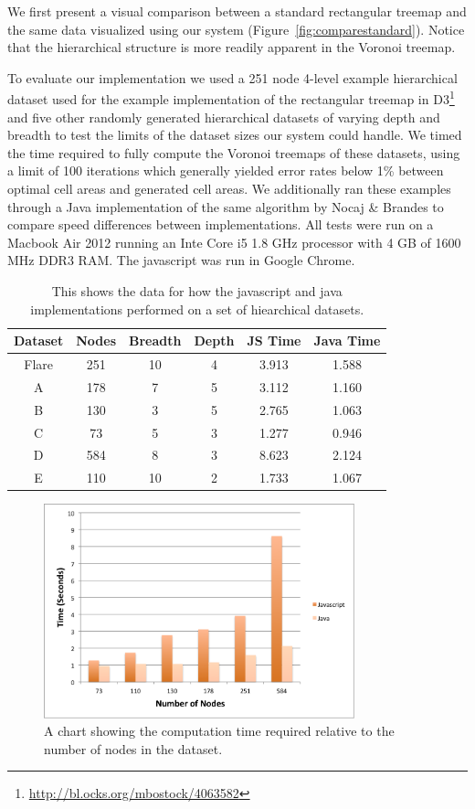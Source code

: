 \documentclass{acm_proc_article-sp} \usepackage{cite}
\begin{document}
We first present a visual comparison between a standard rectangular treemap and the
same data visualized using our system (Figure~\ref{fig:comparestandard}).
Notice that the hierarchical structure is more readily
apparent in the Voronoi treemap.

To evaluate our implementation we used a 251 node 4-level example
hierarchical dataset used for the example implementation of the
rectangular treemap in D3\footnote{\url{http://bl.ocks.org/mbostock/4063582} }
and five other randomly generated
hierarchical datasets of varying depth and breadth to test the limits
of the dataset sizes our system could handle. We timed the time
required to fully compute the Voronoi treemaps of these datasets,
using a limit of 100 iterations which generally yielded error rates
below 1\% between optimal cell areas and generated cell areas. We
additionally ran these examples through a Java implementation of the
same algorithm by Nocaj \& Brandes to compare speed differences
between implementations. All tests were run on a Macbook Air 2012
running an Inte Core i5 1.8 GHz processor with 4 GB of 1600 MHz DDR3
RAM. The javascript was run in Google Chrome.

\begin{table}
\begin{tabular}{ | c | c | c | c | c | c |}
\hline Dataset & Nodes & Breadth & Depth & JS Time & Java Time
\\ \hline Flare & 251 & 10 & 4 & 3.913 & 1.588 \\ A & 178 & 7 & 5 &
3.112 & 1.160 \\ B & 130 & 3 & 5 & 2.765 & 1.063 \\ C & 73 & 5 & 3 &
1.277 & 0.946 \\ D & 584 & 8 & 3 & 8.623 & 2.124 \\ E & 110 & 10 & 2 &
1.733 & 1.067 \\ \hline
\end{tabular}
\caption{This shows the data for how the javascript and java
  implementations performed on a set of hiearchical datasets.}
\label{fig:table}
\end{table}


\begin{figure}
\centering \includegraphics[width=90mm]{figures/chart.png}
\caption{\label{fig:chart} A chart showing the computation time
  required relative to the number of nodes in the dataset.  }
\end{figure}
\end{document}
